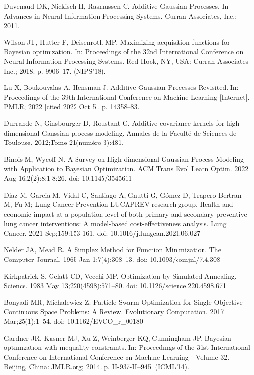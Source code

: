 \documentclass{IOS-Book-Article}
\begin{document}
\begin{thebibliography}{99}
		Duvenaud DK, Nickisch H, Rasmussen C. Additive Gaussian Processes. In: Advances in Neural Information Processing Systems. Curran Associates, Inc.; 2011.
		
		Wilson JT, Hutter F, Deisenroth MP. Maximizing acquisition functions for Bayesian optimization. In: Proceedings of the 32nd International Conference on Neural Information Processing Systems. Red Hook, NY, USA: Curran Associates Inc.; 2018. p. 9906–17. (NIPS’18). 
		
		Lu X, Boukouvalas A, Hensman J. Additive Gaussian Processes Revisited. In: Proceedings of the 39th International Conference on Machine Learning [Internet]. PMLR; 2022 [cited 2022 Oct 5]. p. 14358–83.
		
		Durrande N, Ginsbourger D, Roustant O. Additive covariance kernels for high-dimensional Gaussian process modeling. Annales de la Faculté de Sciences de Toulouse. 2012;Tome 21(numéro 3):481. 
		
		Binois M, Wycoff N. A Survey on High-dimensional Gaussian Process Modeling with Application to Bayesian Optimization. ACM Trans Evol Learn Optim. 2022 Aug 16;2(2):8:1-8:26. doi: 10.1145/3545611
		
		Diaz M, Garcia M, Vidal C, Santiago A, Gnutti G, Gómez D, Trapero-Bertran M, Fu M; Lung Cancer Prevention LUCAPREV research group. Health and economic impact at a population level of both primary and secondary preventive lung cancer interventions: A model-based cost-effectiveness analysis. Lung Cancer. 2021 Sep;159:153-161. doi: 10.1016/j.lungcan.2021.06.027
		
		Nelder JA, Mead R. A Simplex Method for Function Minimization. The Computer Journal. 1965 Jan 1;7(4):308–13. doi: 10.1093/comjnl/7.4.308
		
		Kirkpatrick S, Gelatt CD, Vecchi MP. Optimization by Simulated Annealing. Science. 1983 May 13;220(4598):671–80. doi: 10.1126/science.220.4598.671
		
		Bonyadi MR, Michalewicz Z. Particle Swarm Optimization for Single Objective Continuous Space Problems: A Review. Evolutionary Computation. 2017 Mar;25(1):1–54. doi: 10.1162/EVCO\_r\_00180
		
		Gardner JR, Kusner MJ, Xu Z, Weinberger KQ, Cunningham JP. Bayesian optimization with inequality constraints. In: Proceedings of the 31st International Conference on International Conference on Machine Learning - Volume 32. Beijing, China: JMLR.org; 2014. p. II-937-II–945. (ICML’14). 
		

\end{thebibliography}
\end{document}
